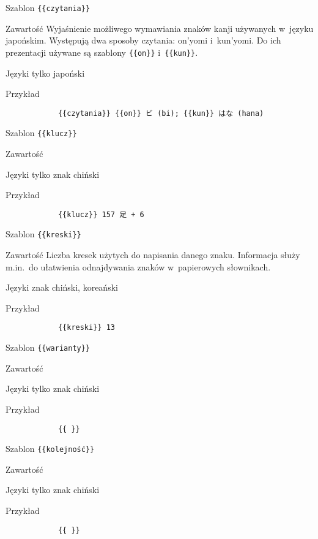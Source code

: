 \documentclass{pracamgr}
\begin{document}
\spacer %
\begin{description-sub}
	\item[Szablon] \verb|{{czytania}}|
	\item[Zawartość] Wyjaśnienie możliwego wymawiania znaków kanji używanych w~języku japońskim. Występują dwa sposoby czytania: on'yomi i~kun'yomi. Do ich prezentacji używane są szablony \verb|{{on}}| i~\verb|{{kun}}|.
	\item[Języki] tylko japoński
	\item[Przykład]
		\begin{verbatim}
			{{czytania}} {{on}} ビ (bi); {{kun}} はな (hana)
		\end{verbatim}
\end{description-sub}
\spacer
\begin{description-sub}
	\item[Szablon] \verb|{{klucz}}|
	\item[Zawartość]
	\item[Języki] tylko znak chiński
	\item[Przykład]
		\begin{verbatim}
			{{klucz}} 157 足 + 6
		\end{verbatim}
\end{description-sub}
\spacer
\begin{description-sub}
	\item[Szablon] \verb|{{kreski}}|
	\item[Zawartość] Liczba kresek użytych do napisania danego znaku. Informacja służy m.in.\ do ułatwienia odnajdywania znaków w~papierowych słownikach.
	\item[Języki] znak chiński, koreański
	\item[Przykład]
		\begin{verbatim}
			{{kreski}} 13
		\end{verbatim}
\end{description-sub}
\spacer
\begin{description-sub}
	\item[Szablon] \verb|{{warianty}}|
	\item[Zawartość]
	\item[Języki] tylko znak chiński
	\item[Przykład]
		\begin{verbatim}
			{{ }}
		\end{verbatim}
\end{description-sub}
\spacer
\begin{description-sub}
	\item[Szablon] \verb|{{kolejność}}|
	\item[Zawartość]
	\item[Języki] tylko znak chiński
	\item[Przykład]
		\begin{verbatim}
			{{ }}
		\end{verbatim}
\end{description-sub}
\end{document}
